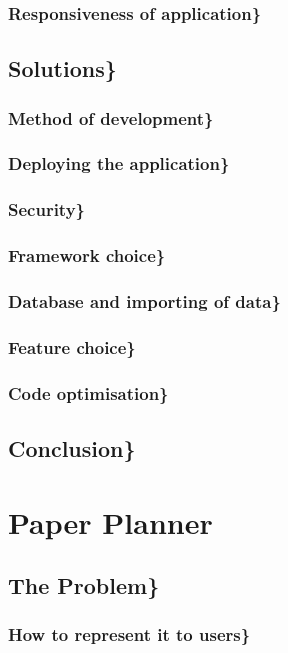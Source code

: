 \documentclass[11pt]{article}
\begin{document}
\subsubsection{Responsiveness of application\}}
\label{sec-2_2_8}
\subsection{Solutions\}}
\label{sec-2_3}
\subsubsection{Method of development\}}
\label{sec-2_3_1}
\subsubsection{Deploying the application\}}
\label{sec-2_3_2}
\subsubsection{Security\}}
\label{sec-2_3_3}
\subsubsection{Framework choice\}}
\label{sec-2_3_4}
\subsubsection{Database and importing of data\}}
\label{sec-2_3_5}
\subsubsection{Feature choice\}}
\label{sec-2_3_6}
\subsubsection{Code optimisation\}}
\label{sec-2_3_7}
\subsection{Conclusion\}}
\label{sec-2_4}
\section{Paper Planner}
\label{sec-3}
\subsection{The Problem\}}
\label{sec-3_1}
\subsubsection{How to represent it to users\}}
\label{sec-3_1_1}
\end{document}
